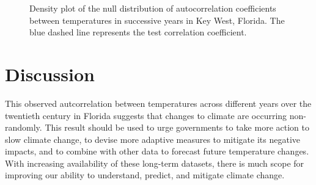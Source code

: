 \documentclass{article}
\begin{document}
\begin{figure}[htbp]
\begin{minipage}{.5\textwidth}
        \caption{Density plot of the null distribution of autocorrelation coefficients between temperatures in successive years in Key West, Florida. The blue dashed line represents the test correlation coefficient.}
        \label{fig:test2}
    \end{minipage}
    \end{figure}\vspace{-1.5em}

\section{Discussion \vspace{-0.5em}}

    This observed autcorrelation between temperatures across different years over the twentieth century in Florida suggests that changes to climate are occurring non-randomly. This result should be used to urge governments to take more action to slow climate change, to devise more adaptive measures to mitigate its negative impacts, and to combine with other data to forecast future temperature changes. With increasing availability of these long-term datasets, there is much scope for improving our ability to understand, predict, and mitigate climate change. \vspace{-1em}


	
	
\end{document}
